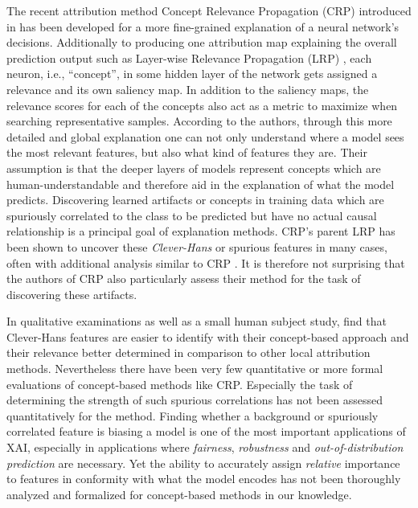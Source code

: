 The recent attribution method Concept Relevance Propagation (CRP) introduced in \cite{Achtibat2022} has been developed for a more fine-grained explanation of a neural network's decisions. Additionally to producing one attribution map explaining the overall prediction output such as Layer-wise Relevance Propagation (LRP) \citep{Bach2015}, each neuron, i.e., ``concept'', in some hidden layer of the network gets assigned a relevance and its own saliency map. In addition to the saliency maps, the relevance scores for each of the concepts also act as a metric to maximize when searching representative samples. According to the authors, through this more detailed and global explanation one can not only understand where a model sees the most relevant features, but also what kind of features they are. Their assumption is that the deeper layers of models represent concepts which are human-understandable and therefore aid in the explanation of what the model predicts. Discovering learned artifacts or concepts in training data which are spuriously correlated to the class to be predicted but have no actual causal relationship is a principal goal of explanation methods. CRP's parent LRP has been shown to uncover these \textit{Clever-Hans} or spurious features in many cases, often with additional analysis similar to CRP \citep{Lapuschkin2019, Anders2022}. It is therefore not surprising that the authors of CRP also particularly assess their method for the task of discovering these artifacts. 

In qualitative examinations as well as a small human subject study, \cite{Achtibat2023} find that Clever-Hans features are easier to identify with their concept-based approach and their relevance better determined in comparison to other local attribution methods. Nevertheless there have been very few quantitative or more formal evaluations of concept-based methods like CRP.
Especially the task of determining the strength of such spurious correlations has not been assessed quantitatively for the method. 
Finding whether a background or spuriously correlated feature is biasing a model is one of the most important applications of XAI, especially in applications where \textit{fairness}, \textit{robustness} and \textit{out-of-distribution prediction} are necessary. Yet the ability to accurately assign \textit{relative} importance to features in conformity with what the model encodes has not been thoroughly analyzed and formalized for concept-based methods in our knowledge. 

